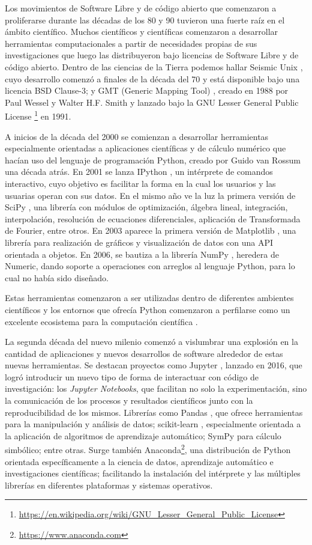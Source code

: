 Los movimientos de Software Libre y de código abierto que comenzaron
a proliferarse durante las décadas de los 80 y 90 tuvieron una fuerte raíz en
el ámbito científico.
Muchos científicos y científicas comenzaron a desarrollar herramientas
computacionales a partir de necesidades propias de sus investigaciones que
luego las distribuyeron bajo licencias de Software Libre y de código abierto.
Dentro de las ciencias de la Tierra podemos hallar Seismic Unix
\citep{seismicunix}, cuyo desarrollo comenzó a finales de la década del 70
y está disponible bajo una licencia BSD Clause-3; y GMT (Generic Mapping Tool)
\citep{gmt1991,gmt2019}, creado en 1988 por Paul Wessel y Walter H.F.
Smith y lanzado bajo la GNU Lesser General Public License%
\footnote{%
    \url{https://en.wikipedia.org/wiki/GNU_Lesser_General_Public_License}%
}
en 1991.

A inicios de la década del 2000 se comienzan a desarrollar herramientas
especialmente orientadas a aplicaciones científicas y de cálculo numérico que
hacían uso del lenguaje de programación Python, creado por Guido van Rossum una
década atrás.
En 2001 se lanza IPython \citep{perez2007}, un intérprete de comandos
interactivo, cuyo objetivo es facilitar la forma en la cual los usuarios y las
usuarias operan con sus datos.
En el mismo año ve la luz la primera versión de SciPy \citep{scipy2020}, una
librería con módulos de optimización, álgebra lineal, integración,
interpolación, resolución de ecuaciones diferenciales, aplicación de
Transformada de Fourier, entre otros.
En 2003 aparece la primera versión de Matplotlib \citep{matplotlib2007}, una
librería para realización de gráficos y visualización de datos con una \ac{API}
orientada a objetos.
En 2006, se bautiza a la librería NumPy \citep{numpy2020}, heredera de Numeric,
dando soporte a operaciones con arreglos al lenguaje Python, para lo cual no
había sido diseñado.

Estas herramientas comenzaron a ser utilizadas dentro de diferentes ambientes
científicos y los entornos que ofrecía Python comenzaron a perfilarse como un
excelente ecosistema para la computación científica
\citep{travis2007,millman2011,perez2011}.

La segunda década del nuevo milenio comenzó a vislumbrar una explosión en la
cantidad de aplicaciones y nuevos desarrollos de software alrededor de estas
nuevas herramientas.
Se destacan proyectos como Jupyter \citep{jupyter2016}, lanzado en 2016, que
logró introducir un nuevo tipo de forma de interactuar con código de
investigación: los \emph{Jupyter Notebooks}, que facilitan no solo la
experimentación, sino la comunicación de los procesos y resultados científicos
junto con la reproducibilidad de los mismos.
Librerías como Pandas \citep{pandas2010}, que ofrece herramientas para la
manipulación y análisis de datos; scikit-learn \citep{sklearn2011},
especialmente orientada a la aplicación de algoritmos de aprendizaje
automático; SymPy \citep{sympy2017} para cálculo simbólico; entre otras.
Surge también Anaconda\footnote{\url{https://www.anaconda.com}}, una
distribución de Python orientada específicamente a la ciencia de datos,
aprendizaje automático e investigaciones científicas; facilitando la
instalación del intérprete y las múltiples librerías en diferentes plataformas
y sistemas operativos.

